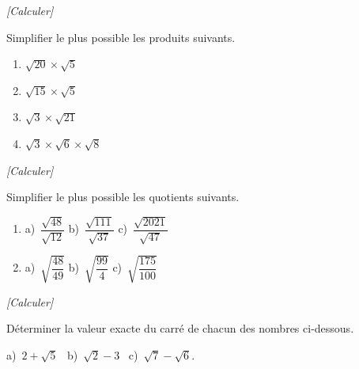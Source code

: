\exo \textit{[Calculer]}

Simplifier le plus possible les produits suivants.

\begin{enumerate}
\item $\sqrt{20} \times \sqrt{5}$
\item $\sqrt{15} \times \sqrt{5}$	
\item $\sqrt{3} \times \sqrt{21}$
\item $\sqrt{3} \times \sqrt{6}\times \sqrt{8}$
\end{enumerate}

\exo \textit{[Calculer]}

Simplifier le plus possible les quotients suivants.

\begin{enumerate}
\item a)~$\dfrac{\sqrt{48}}{\sqrt{12}}$ \hspace{1cm} b)~$\dfrac{\sqrt{111}}{\sqrt{37}}$ \hspace{1cm} c)~$\dfrac{\sqrt{2021}}{\sqrt{47}}$
\item a)~$\sqrt{\dfrac{48}{49}}$ \hspace{1cm} b)~$\sqrt{\dfrac{99}{4}}$ \hspace{1cm} c)~$\sqrt{\dfrac{175}{100}}$
\end{enumerate}


\exo \textit{[Calculer]}

Déterminer la valeur exacte du carré de chacun des nombres ci-dessous.

 a)~$2+\sqrt{5}$~\hspace{0.8cm} b)~$\sqrt{2}-3$~\hspace{0.8cm} c)~$\sqrt{7}-\sqrt{6}$.




